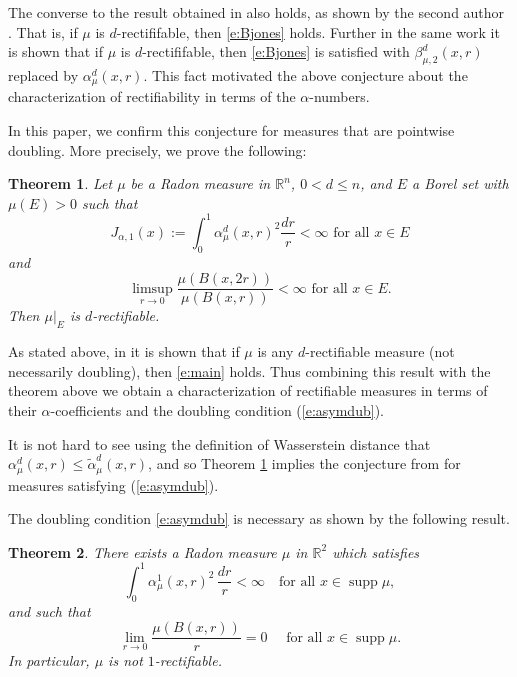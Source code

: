 \documentclass[11pt]{amsart}
\newcommand{\R}{{\mathbb R}}       %
\newcommand{\rf}[1]{{(\ref{#1})}}
\newcommand{\supp}{\operatorname{supp}}
\newcommand{\wt}[1]{{\widetilde{#1}}}
\newcommand{\Bl}{\color{blue}}
\newtheorem{main}{Theorem}
\theoremstyle{definition}
\theoremstyle{remark}
\numberwithin{equation}{section}
\newcommand{\xavi}[1]{}%
\begin{document}
\xavi{I changed a little the wording in this paragraph}
The converse to the result obtained in \cite{AT15} also holds, as shown by the second author \cite{Tol15-I}. That is, if $\mu$ is $d$-rectififable, then \eqref{e:Bjones} holds. 
Further in the same work it is shown that if $\mu$ is $d$-rectififable, then \eqref{e:Bjones} is satisfied  with $\beta_{\mu,2}^{d}(x,r)$ replaced by $\alpha_\mu^d(x,r)$.
This fact motivated the above conjecture about the characterization of rectifiability in terms of the $\alpha$-numbers. 

In this paper, we confirm this conjecture for measures that are pointwise doubling. More precisely, we prove the following:

\begin{main}\label{thmi}
	Let $\mu$ be a Radon measure in $\R^{n}$, $0<d\leq n$, and $E$ a Borel set with $\mu(E)>0$ such that 
	\begin{equation}\label{e:main}
	J_{\alpha,1}(x):=\int_{0}^{1} \alpha_{\mu}^{d}(x,r)^{2}\frac{dr}{r} <\infty \mbox{ for all }x\in E
	\end{equation}
	and 
	\begin{equation}\label{e:asymdub}
	\limsup_{r\rightarrow 0}\frac{\mu(B(x,2r))}{\mu(B(x,r))} <\infty \mbox{ for all }x\in E.
	\end{equation}
	Then $\mu|_{E}$ is $d$-rectifiable. 
\end{main}

As stated above, in \cite{Tol15-I} it is shown that if $\mu$ is any $d$-rectifiable measure (not necessarily doubling), then \eqref{e:main} holds. Thus combining this result with  the theorem above we obtain a characterization of rectifiable measures in terms of their $\alpha$-coefficients and the doubling condition
\rf{e:asymdub}. 

It is not hard to see using the definition of Wasserstein distance that 
$\alpha_{\mu}^d(x,r) \leq \wt{\alpha}_{\mu}^d(x,r)$, and so Theorem \ref{thmi} implies the conjecture from \cite{ADT16} for measures satisfying \rf{e:asymdub}.

The doubling condition \eqref{e:asymdub} is necessary as shown by the following result.


\begin{main}\label{teocount1}
	There exists a  Radon measure $\mu$ in $\R^2$ which satisfies
	\begin{equation*}
	\int_0^1\alpha_\mu^1(x,r)^2\,\frac{dr}r<\infty\quad \mbox{for all $x\in \supp\mu$},
	\end{equation*}
	and such that 
	$$\lim_{r\to 0}\frac{\mu(B(x,r))}r =0\quad\mbox{ for all $x\in\supp\mu$.}$$
	In particular, $\mu$ is not $1$-rectifiable. 
\end{main}
\end{document}
